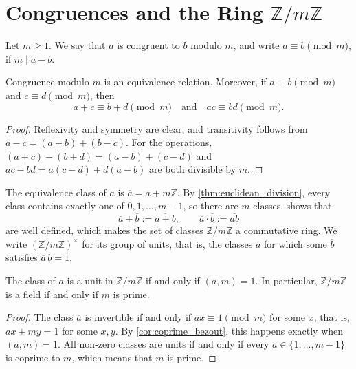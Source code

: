 \section{Congruences and the Ring $\mathbb{Z}/m\mathbb{Z}$}

\begin{definition}[Congruence]\label{def:congruence}
    Let $m \ge 1$. We say that $a$ is congruent to $b$ modulo $m$, and write $a \equiv b \pmod m$, if $m \mid a - b$.
\end{definition}

\begin{proposition}\label{prop:congruence_properties}
    Congruence modulo $m$ is an equivalence relation. Moreover, if $a \equiv b \pmod m$ and $c \equiv d \pmod m$, then
    \begin{equation*}
        a + c \equiv b + d \pmod m \quad \text{and} \quad ac \equiv bd \pmod m.
    \end{equation*}
\end{proposition}
\begin{proof}
    Reflexivity and symmetry are clear, and transitivity follows from $a - c = (a - b) + (b - c)$. For the operations, $(a + c) - (b + d) = (a - b) + (c - d)$ and $ac - bd = a(c - d) + d(a - b)$ are both divisible by $m$.
\end{proof}

The equivalence class of $a$ is $\overline{a} = a + m\mathbb{Z}$. By \cref{thm:euclidean_division}, every class contains exactly one of $0, 1, \dots, m-1$, so there are $m$ classes.  shows that
\begin{equation*}
    \overline{a} + \overline{b} := \overline{a + b}, \qquad \overline{a} \cdot \overline{b} := \overline{ab}
\end{equation*}
are well defined, which makes the set of classes $\mathbb{Z}/m\mathbb{Z}$ a commutative ring. We write $(\mathbb{Z}/m\mathbb{Z})^\times$ for its group of units, that is, the classes $\overline{a}$ for which some $\overline{b}$ satisfies $\overline{a}\,\overline{b} = \overline{1}$.

\begin{proposition}\label{prop:units_mod_m}
    The class of $a$ is a unit in $\mathbb{Z}/m\mathbb{Z}$ if and only if $(a,m) = 1$. In particular, $\mathbb{Z}/m\mathbb{Z}$ is a field if and only if $m$ is prime.
\end{proposition}
\begin{proof}
    The class $\overline{a}$ is invertible if and only if $ax \equiv 1 \pmod m$ for some $x$, that is, $ax + my = 1$ for some $x, y$. By \cref{cor:coprime_bezout}, this happens exactly when $(a,m) = 1$. All non-zero classes are units if and only if every $a \in \{1, \dots, m-1\}$ is coprime to $m$, which means that $m$ is prime.
\end{proof}

